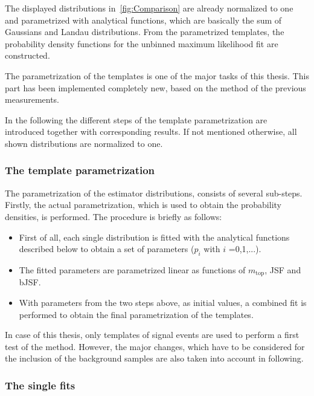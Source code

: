 { The displayed distributions in~\cref{fig:Comparison} are already normalized to one and parametrized with analytical functions, which are basically the sum of  Gaussians and Landau distributions. From the parametrized templates, the probability density functions for the unbinned maximum likelihood fit are constructed. 
 
 

The parametrization of the templates is one of the major tasks of this thesis. This part has been implemented completely new, based on the method of the previous measurements. 

In the following the different steps of the template parametrization are introduced together with corresponding results. If not mentioned otherwise, all shown distributions are normalized to one. 




  
  
\clearpage  

\subsubsection{The template parametrization}


The parametrization of the estimator distributions, consists of several sub-steps. Firstly, the actual parametrization, which is used to obtain the probability densities, is performed. The procedure is briefly as follows: 
\begin{itemize}
	\item First of all, each single distribution is fitted with the analytical functions described below to obtain a set of parameters ($p_i$ with $i$ =0,1,...).
	\item The fitted parameters are parametrized linear as functions of $m_{\text{top}}$, JSF and bJSF. 
	\item With parameters from the two steps above, as initial values, a combined fit is performed to obtain the final parametrization of the templates.
\end{itemize}   

 
 In case of this thesis,  only templates of signal events are used to perform a first test of the method. However, the major changes, which have to be considered for the inclusion of the background samples are also taken into account in following.  


\subsubsection{The single fits}  


}
